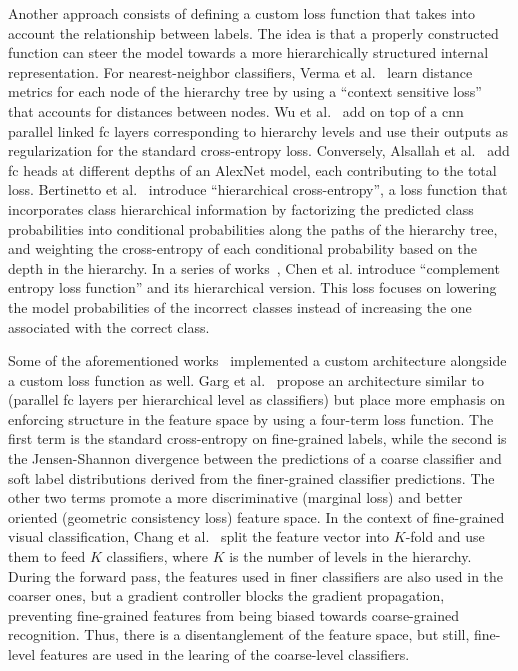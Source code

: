 Another approach consists of defining a custom loss function that takes into account the relationship between labels. The idea is that a properly constructed function can steer the model towards a more hierarchically structured internal representation.
For nearest-neighbor classifiers, Verma et al.~\cite{LearningHierarVerma2012} learn distance metrics for each node of the hierarchy tree by using a ``context sensitive loss'' that accounts for distances between nodes.
Wu et al.~\cite{LearningToMakWuHu2016} add on top of a \acrshort{cnn} parallel linked \acrshort{fc} layers corresponding to hierarchy levels and use their outputs as regularization for the standard cross-entropy loss.
Conversely, Alsallah et al.~\cite{DoConvolutionaAlsall2017} add \acrshort{fc} heads at different depths of an AlexNet model, each contributing to the total loss.
Bertinetto et al.~\cite{MakingBetterMBertin2019} introduce ``hierarchical cross-entropy'', a loss function that incorporates class hierarchical information by factorizing the predicted class probabilities into conditional probabilities along the paths of the hierarchy tree, and weighting the cross-entropy of each conditional probability based on the depth in the hierarchy.
In a series of works~\cite{ComplementObjeChen2019, ImprovingAdverChen2019, LearningWithHChen2019}, Chen et al. introduce ``complement entropy loss function'' and its hierarchical version. This loss focuses on lowering the model probabilities of the incorrect classes instead of increasing the one associated with the correct class.

Some of the aforementioned works~\cite{LearningToMakWuHu2016, DoConvolutionaAlsall2017} implemented a custom architecture alongside a custom loss function as well.
Garg et al.~\cite{LearningHierarGarg2022} propose an architecture similar to~\cite{LearningToMakWuHu2016} (parallel \acrshort{fc} layers per hierarchical level as classifiers) but place more emphasis on enforcing structure in the feature space by using a four-term loss function. The first term is the standard cross-entropy on fine-grained labels, while the second is the Jensen-Shannon divergence between the predictions of a coarse classifier and soft label distributions derived from the finer-grained classifier predictions. The other two terms promote a more discriminative (marginal loss) and better oriented (geometric consistency loss) feature space.
In the context of fine-grained visual classification, Chang et al.~\cite{YourFlamingoChang2020} split the feature vector into $K$-fold and use them to feed $K$ classifiers, where $K$ is the number of levels in the hierarchy. During the forward pass, the features used in finer classifiers are also used in the coarser ones, but a gradient controller blocks the gradient propagation, preventing fine-grained features from being biased towards coarse-grained recognition. Thus, there is a disentanglement of the feature space, but still, fine-level features are used in the learing of the coarse-level classifiers.

